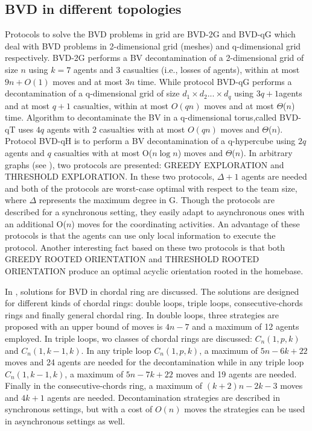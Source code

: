 \subsection{BVD in different topologies}
Protocols to solve the  BVD problems in grid are BVD-2G and BVD-qG which deal with BVD problems in 2-dimensional grid (meshes) and q-dimensional grid respectively. BVD-2G performs a BV decontamination of a 2-dimensional grid of size $n$ using $k=7$ agents and 3 casualties (i.e., losses of agents), within at most $9n+O(1)$ moves and at most $3n$ time. While protocol BVD-qG performs a decontamination of a q-dimensional grid of size $d_1\times d_2 ...\times d_q$ using $3q+1$agents and at most $q+1$ casualties, within at most $O(qn)$ moves and at most $\Theta$($n$) time. Algorithm to decontaminate the BV in a q-dimensional torus,called BVD-qT uses $4q$ agents with 2 casualties with at most $O(qn)$ moves and $\Theta$($n$). Protocol BVD-qH is to perform a BV decontamination of a q-hypercube using $2q$ agents and $q$ casualties with at most O($n\log n$) moves and $\Theta$($n$). In arbitrary graphs (see \cite{cai1}), two protocols are presented: GREEDY EXPLORATION and THRESHOLD EXPLORATION. In these two protocols, $\Delta +1$ agents are needed and both of the protocols are worst-case optimal with respect to the team size, where $\Delta$ represents the maximum degree in G. Though the protocols are described for a synchronous setting, they easily adapt to asynchronous ones with an additional O($n$) moves for the coordinating activities. An advantage of these protocols is that the agents can use only local information to execute the protocol. Another interesting fact based on these two protocols is that both GREEDY ROOTED ORIENTATION and THRESHOLD ROOTED ORIENTATION produce an optimal acyclic orientation rooted in the homebase.

In \cite{alotaibi}, solutions for BVD in chordal ring are discussed. The solutions are designed for  different kinds of chordal rings: double loops, triple loops, consecutive-chords rings and finally general chordal ring. In double loops,     three strategies  are proposed  
with an  upper bound of moves is $4n-7$  and a maximum of 12 agents   employed.
In triple loops,  wo classes of chordal rings are discussed: $C_n(1,p,k)$  and $C_n(1,k-1,k)$. In any triple loop $C_n(1,p,k)$, a maximum of $5n-6k+22$ moves and 24 agents are needed for the decontamination while in any triple loop $C_n(1,k-1,k)$, a maximum of $5n-7k+22$ moves and 19 agents are needed. Finally in the consecutive-chords ring, a maximum of $(k+2)n-2k-3$ moves and $4k+1$ agents are needed. Decontamination strategies  are described  in synchronous settings, but   with a cost of $O(n)$ moves   the strategies can be used in asynchronous settings as well.







 









